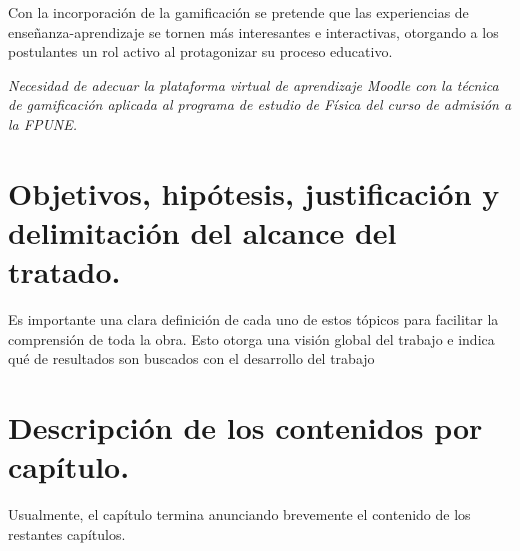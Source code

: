 Con la incorporación de la gamificación se pretende que las experiencias de enseñanza-aprendizaje se tornen más interesantes e interactivas, otorgando a los postulantes un rol activo al protagonizar su proceso educativo.

\textit{
    Necesidad de adecuar la plataforma virtual de aprendizaje Moodle con la técnica de gamificación aplicada al programa de estudio de Física del curso de admisión a la FPUNE.
}

\section{Objetivos, hipótesis, justificación y delimitación del alcance del tratado.}
Es importante una clara definición de cada uno de estos tópicos para facilitar la comprensión de toda la obra. Esto otorga una visión global del trabajo e indica qué de resultados son buscados con el desarrollo del trabajo







\section{Descripción de los contenidos por capítulo.} 
Usualmente, el capítulo termina anunciando brevemente el contenido de los restantes capítulos.

